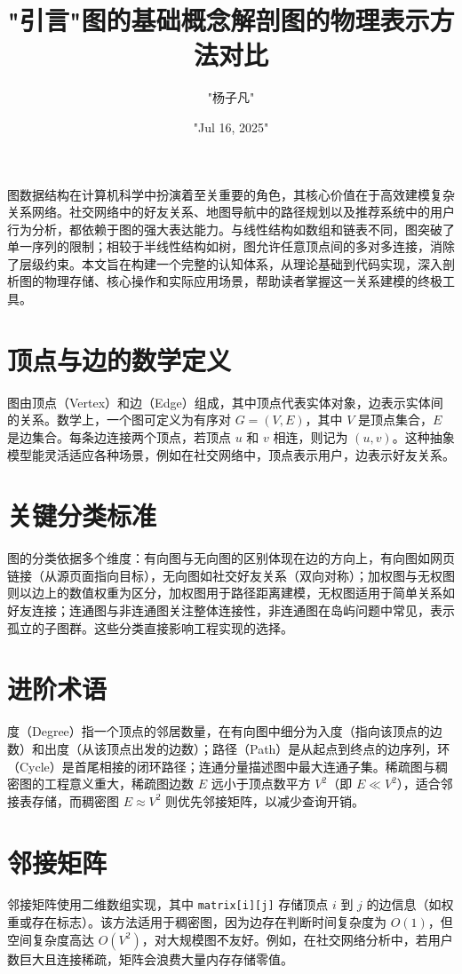 \title{"引言"}
\author{"杨子凡"}
\date{"Jul 16, 2025"}
\maketitle
图数据结构在计算机科学中扮演着至关重要的角色，其核心价值在于高效建模复杂关系网络。社交网络中的好友关系、地图导航中的路径规划以及推荐系统中的用户行为分析，都依赖于图的强大表达能力。与线性结构如数组和链表不同，图突破了单一序列的限制；相较于半线性结构如树，图允许任意顶点间的多对多连接，消除了层级约束。本文旨在构建一个完整的认知体系，从理论基础到代码实现，深入剖析图的物理存储、核心操作和实际应用场景，帮助读者掌握这一关系建模的终极工具。\par
\title{图的基础概念解剖}
\chapter{顶点与边的数学定义}
图由顶点（Vertex）和边（Edge）组成，其中顶点代表实体对象，边表示实体间的关系。数学上，一个图可定义为有序对 $G = (V, E)$，其中 $V$ 是顶点集合，$E$ 是边集合。每条边连接两个顶点，若顶点 $u$ 和 $v$ 相连，则记为 $(u, v)$。这种抽象模型能灵活适应各种场景，例如在社交网络中，顶点表示用户，边表示好友关系。\par
\chapter{关键分类标准}
图的分类依据多个维度：有向图与无向图的区别体现在边的方向上，有向图如网页链接（从源页面指向目标），无向图如社交好友关系（双向对称）；加权图与无权图则以边上的数值权重为区分，加权图用于路径距离建模，无权图适用于简单关系如好友连接；连通图与非连通图关注整体连接性，非连通图在岛屿问题中常见，表示孤立的子图群。这些分类直接影响工程实现的选择。\par
\chapter{进阶术语}
度（Degree）指一个顶点的邻居数量，在有向图中细分为入度（指向该顶点的边数）和出度（从该顶点出发的边数）；路径（Path）是从起点到终点的边序列，环（Cycle）是首尾相接的闭环路径；连通分量描述图中最大连通子集。稀疏图与稠密图的工程意义重大，稀疏图边数 $E$ 远小于顶点数平方 $V^2$（即 $E \ll V^2$），适合邻接表存储，而稠密图 $E \approx V^2$ 则优先邻接矩阵，以减少查询开销。\par
\title{图的物理表示方法对比}
\chapter{邻接矩阵}
邻接矩阵使用二维数组实现，其中 \texttt{matrix[i][j]} 存储顶点 $i$ 到 $j$ 的边信息（如权重或存在标志）。该方法适用于稠密图，因为边存在判断时间复杂度为 $O(1)$，但空间复杂度高达 $O(V^2)$，对大规模图不友好。例如，在社交网络分析中，若用户数巨大且连接稀疏，矩阵会浪费大量内存存储零值。\par
